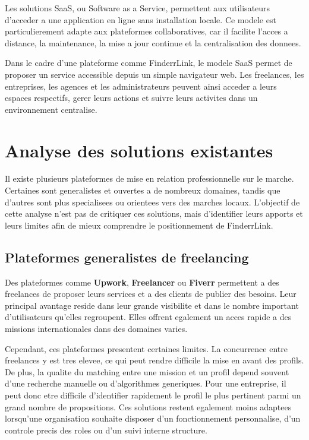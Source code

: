 Les solutions SaaS, ou Software as a Service, permettent aux utilisateurs d'acceder a une application en ligne sans installation locale. Ce modele est particulierement adapte aux plateformes collaboratives, car il facilite l'acces a distance, la maintenance, la mise a jour continue et la centralisation des donnees.

Dans le cadre d'une plateforme comme FinderrLink, le modele SaaS permet de proposer un service accessible depuis un simple navigateur web. Les freelances, les entreprises, les agences et les administrateurs peuvent ainsi acceder a leurs espaces respectifs, gerer leurs actions et suivre leurs activites dans un environnement centralise.

\section{Analyse des solutions existantes}

Il existe plusieurs plateformes de mise en relation professionnelle sur le marche. Certaines sont generalistes et ouvertes a de nombreux domaines, tandis que d'autres sont plus specialisees ou orientees vers des marches locaux. L'objectif de cette analyse n'est pas de critiquer ces solutions, mais d'identifier leurs apports et leurs limites afin de mieux comprendre le positionnement de FinderrLink.

\subsection{Plateformes generalistes de freelancing}

Des plateformes comme \textbf{Upwork}, \textbf{Freelancer} ou \textbf{Fiverr} permettent a des freelances de proposer leurs services et a des clients de publier des besoins. Leur principal avantage reside dans leur grande visibilite et dans le nombre important d'utilisateurs qu'elles regroupent. Elles offrent egalement un acces rapide a des missions internationales dans des domaines varies.

Cependant, ces plateformes presentent certaines limites. La concurrence entre freelances y est tres elevee, ce qui peut rendre difficile la mise en avant des profils. De plus, la qualite du matching entre une mission et un profil depend souvent d'une recherche manuelle ou d'algorithmes generiques. Pour une entreprise, il peut donc etre difficile d'identifier rapidement le profil le plus pertinent parmi un grand nombre de propositions. Ces solutions restent egalement moins adaptees lorsqu'une organisation souhaite disposer d'un fonctionnement personnalise, d'un controle precis des roles ou d'un suivi interne structure.

